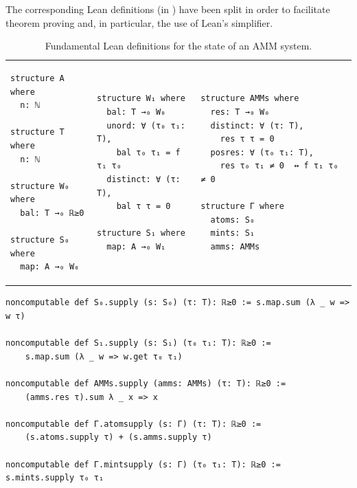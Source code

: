 The corresponding Lean definitions (in ) 
have been split in order to facilitate theorem proving and, in particular, the use of Lean's simplifier.

\begin{table}[t]
    \caption{Fundamental Lean definitions for the state of an AMM system.}
    \label{tab:amm-system}
    \vspace{-20pt}
    \centering
    \begin{tabular}{p{0.25\linewidth}p{0.30\linewidth}p{0.45\linewidth}}
    \begin{lstlisting}[numbers=none]
structure A where
  n: ℕ

structure T where
  n: ℕ

structure W₀ where
  bal: T →₀ ℝ≥0
  
structure S₀ where
  map: A →₀ W₀\end{lstlisting} & 
    \begin{lstlisting}[numbers=none]
structure W₁ where
  bal: T →₀ W₀
  unord: ∀ (τ₀ τ₁: T), 
    bal τ₀ τ₁ = f τ₁ τ₀
  distinct: ∀ (τ: T), 
    bal τ τ = 0
  
structure S₁ where
  map: A →₀ W₁ \end{lstlisting} &
    \begin{lstlisting}[numbers=none]
structure AMMs where
  res: T →₀ W₀
  distinct: ∀ (τ: T), 
    res τ τ = 0
  posres: ∀ (τ₀ τ₁: T), 
    res τ₀ τ₁ ≠ 0  ↔ f τ₁ τ₀ ≠ 0

structure Γ where
  atoms: S₀
  mints: S₁
  amms: AMMs\end{lstlisting}
    \end{tabular}
\end{table}

\begin{table}[t]
\caption{Supply of atomic token types and of minted token types.}
\label{list:supplydefs}
\begin{lstlisting}
noncomputable def S₀.supply (s: S₀) (τ: T): ℝ≥0 := s.map.sum (λ _ w => w τ)

noncomputable def S₁.supply (s: S₁) (τ₀ τ₁: T): ℝ≥0 := 
    s.map.sum (λ _ w => w.get τ₀ τ₁)

noncomputable def AMMs.supply (amms: AMMs) (τ: T): ℝ≥0 := 
    (amms.res τ).sum λ _ x => x

noncomputable def Γ.atomsupply (s: Γ) (τ: T): ℝ≥0 := 
    (s.atoms.supply τ) + (s.amms.supply τ)

noncomputable def Γ.mintsupply (s: Γ) (τ₀ τ₁: T): ℝ≥0 := s.mints.supply τ₀ τ₁
\end{lstlisting}
\end{table}
